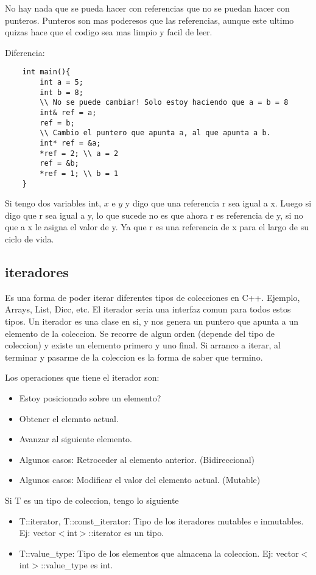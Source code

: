 \documentclass[11pt]{article}
\begin{document}
No hay nada que se pueda hacer con referencias que no se puedan hacer con punteros.
Punteros son mas poderesos que las referencias, aunque este ultimo quizas hace
que el codigo sea mas limpio y facil de leer.

Diferencia:
\begin{lstlisting}
    int main(){
        int a = 5;
        int b = 8;
        \\ No se puede cambiar! Solo estoy haciendo que a = b = 8
        int& ref = a;
        ref = b;
        \\ Cambio el puntero que apunta a, al que apunta a b.
        int* ref = &a;
        *ref = 2; \\ a = 2
        ref = &b;
        *ref = 1; \\ b = 1
    }
\end{lstlisting}

Si tengo dos variables int, $x$ e $y$ y digo que una referencia r sea igual a x.
Luego si digo que r sea igual a y, lo que sucede no es que ahora r es referencia de
y, si no que a x le asigna el valor de y. Ya que r es una referencia de x para el
largo de su ciclo de vida.


\subsection{iteradores}
Es una forma de poder iterar diferentes tipos de colecciones en C++.
Ejemplo, Arrays, List, Dicc, etc.
El iterador seria una interfaz comun para todos estos tipos.
Un iterador es una clase en si, y nos genera un puntero que apunta a un elemento de la coleccion.
Se recorre de algun orden (depende del tipo de coleccion) y existe un elemento
primero y uno final.
Si arranco a iterar, al terminar y pasarme de la coleccion es la forma de saber que
termino.

Los operaciones que tiene el iterador son:
\begin{itemize}
    \item Estoy posicionado sobre un elemento?
    \item Obtener el elemnto actual.
    \item Avanzar al siguiente elemento.
    \item Algunos casos: Retroceder al elemento anterior. (Bidireccional)
    \item Algunos casos: Modificar el valor del elemento actual.   (Mutable)
\end{itemize}

Si T es un tipo de coleccion, tengo lo siguiente
\begin{itemize}
    \item T::iterator, T::const\_iterator: Tipo de los iteradores mutables e inmutables.
        Ej: vector$<$int$>$::iterator es un tipo.
    \item T::value\_type: Tipo de los elementos que almacena la coleccion.
        Ej: vector$<$int$>$::value\_type es int.
\end{itemize}
\end{document}

